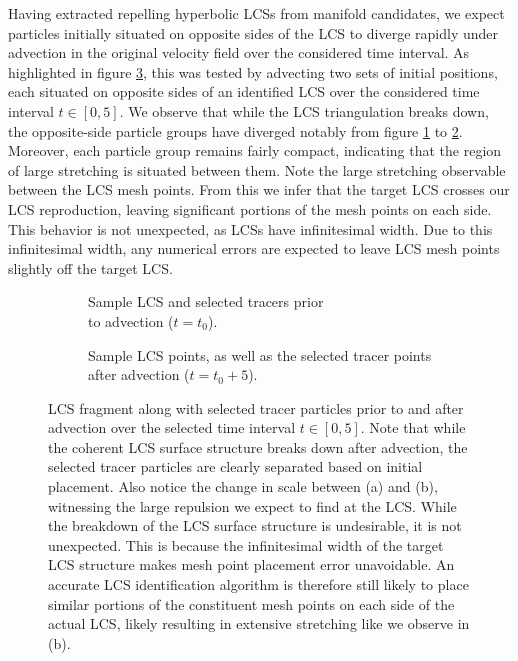 Having extracted repelling hyperbolic LCSs from manifold candidates, we expect particles initially situated on opposite sides of the LCS to diverge rapidly under advection in the original velocity field over the considered time interval. As highlighted in figure \ref{fig:blobtest}, this was tested by advecting two sets of initial positions, each situated on opposite sides of an identified LCS over the considered time interval $t\in [0,5]$. We observe that while the LCS triangulation breaks down, the opposite-side particle groups have diverged notably from figure \ref{fig:blobtest_a} to \ref{fig:blobtest_b}. Moreover, each particle group remains fairly compact, indicating that the region of large stretching is situated between them. Note the large stretching observable between the LCS mesh points. From this we infer that the target LCS crosses our LCS reproduction, leaving significant portions of the mesh points on each side. This behavior is not unexpected, as LCSs have infinitesimal width. Due to this infinitesimal width, any numerical errors are expected to leave LCS mesh points slightly off the target LCS. 

\begin{figure}[h!] 

\centering
\begin{subfigure}[b]{0.45\textwidth}
\centering

\caption{Sample LCS and selected tracers prior\\ to advection ($t=t_0$).}\label{fig:blobtest_a}
\end{subfigure}
\begin{subfigure}[b]{0.45\textwidth}
\centering

\caption{Sample LCS points, as well as the selected tracer points after advection ($t=t_0+5$).}\label{fig:blobtest_b}
\end{subfigure}

\caption{LCS fragment along with selected tracer particles prior to and after advection over the selected time interval $t\in [0,5]$. Note that while the coherent LCS surface structure breaks down after advection, the selected tracer particles are clearly separated based on initial placement. Also notice the change in scale between (a) and (b), witnessing the large repulsion we expect to find at the LCS. While the breakdown of the LCS surface structure is undesirable, it is not unexpected. This is because the infinitesimal width of the target LCS structure makes mesh point placement error unavoidable. An accurate LCS identification algorithm is therefore still likely to place similar portions of the constituent mesh points on each side of the actual LCS, likely resulting in extensive stretching like we observe in (b).}\label{fig:blobtest}
\end{figure}

